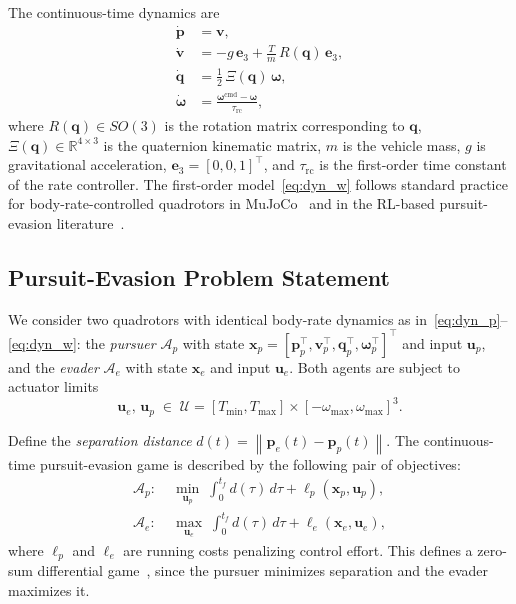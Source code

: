 \documentclass[lettersize,journal]{IEEEtran}
\theoremstyle{definition}
\theoremstyle{remark}
\newcommand{\R}{\mathbb{R}}
\newcommand{\norm}[1]{\left\| #1 \right\|}
\newcommand{\vect}[1]{\bm{#1}}
\begin{document}
The continuous-time dynamics are
\begin{align}
    \dot{\vect{p}} &= \vect{v}, \label{eq:dyn_p} \\
    \dot{\vect{v}} &= -g\,\vect{e}_3
                      + \frac{T}{m}\,R(\vect{q})\,\vect{e}_3,
                      \label{eq:dyn_v} \\
    \dot{\vect{q}} &= \frac{1}{2}\,\Xi(\vect{q})\,\vect{\omega},
                      \label{eq:dyn_q} \\
    \dot{\vect{\omega}} &= \frac{\vect{\omega}^{\mathrm{cmd}}
                                 - \vect{\omega}}{\tau_{\mathrm{rc}}},
                      \label{eq:dyn_w}
\end{align}
where $R(\vect{q}) \in SO(3)$ is the rotation matrix corresponding
to $\vect{q}$, $\Xi(\vect{q}) \in \R^{4\times 3}$ is the
quaternion kinematic matrix, $m$ is the vehicle mass,
$g$ is gravitational acceleration, $\vect{e}_3 = [0,0,1]^\top$,
and $\tau_{\mathrm{rc}}$ is the first-order time constant of the
rate controller.
The first-order model~\eqref{eq:dyn_w} follows standard practice for
body-rate-controlled quadrotors in MuJoCo~\cite{todorov2012mujoco}
and in the RL-based pursuit-evasion literature~\cite{kaufmann2025learned}.

\subsection{Pursuit-Evasion Problem Statement}
\label{sec:pe_game}

We consider two quadrotors with identical body-rate dynamics as
in~\eqref{eq:dyn_p}--\eqref{eq:dyn_w}: the \emph{pursuer}
$\mathcal{A}_p$ with state
$\vect{x}_p = [\vect{p}_p^\top, \vect{v}_p^\top,
               \vect{q}_p^\top, \vect{\omega}_p^\top]^\top$
and input $\vect{u}_p$, and the \emph{evader} $\mathcal{A}_e$ with
state $\vect{x}_e$ and input $\vect{u}_e$.
Both agents are subject to actuator limits
\begin{equation}
    \vect{u}_e,\,\vect{u}_p \;\in\;
    \mathcal{U} = [T_{\min},T_{\max}]\times[-\omega_{\max},
                  \omega_{\max}]^3.
    \label{eq:input_set}
\end{equation}

Define the \emph{separation distance}
$d(t) = \norm{\vect{p}_e(t) - \vect{p}_p(t)}$.
The continuous-time pursuit-evasion game is described by the
following pair of objectives:
\begin{align}
    \mathcal{A}_p: &\;\min_{\vect{u}_p}\;
        \int_0^{t_f} d(\tau)\,d\tau
        + \ell_p(\vect{x}_p,\vect{u}_p),
    \label{eq:pursuer_obj} \\
    \mathcal{A}_e: &\;\max_{\vect{u}_e}\;
        \int_0^{t_f} d(\tau)\,d\tau
        + \ell_e(\vect{x}_e,\vect{u}_e),
    \label{eq:evader_obj}
\end{align}
where $\ell_p$ and $\ell_e$ are running costs penalizing control
effort.
This defines a zero-sum differential
game~\cite{isaacs1965differential}, since the pursuer minimizes
separation and the evader maximizes it.
\end{document}
